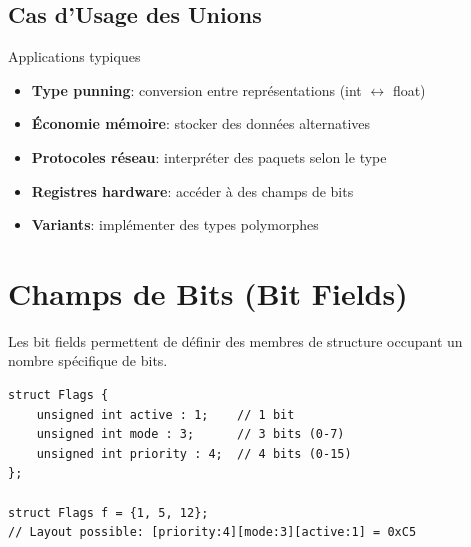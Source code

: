 \documentclass[10pt,a4paper]{article}
\begin{document}
\begin{center}
\end{center}

\subsection{Cas d'Usage des Unions}

\begin{techbox}{Applications typiques}
\begin{itemize}
\item \textbf{Type punning}: conversion entre représentations (int $\leftrightarrow$ float)
\item \textbf{Économie mémoire}: stocker des données alternatives
\item \textbf{Protocoles réseau}: interpréter des paquets selon le type
\item \textbf{Registres hardware}: accéder à des champs de bits
\item \textbf{Variants}: implémenter des types polymorphes
\end{itemize}
\end{techbox}

\section{Champs de Bits (Bit Fields)}

Les bit fields permettent de définir des membres de structure occupant un nombre spécifique de bits.

\begin{lstlisting}
struct Flags {
    unsigned int active : 1;    // 1 bit
    unsigned int mode : 3;      // 3 bits (0-7)
    unsigned int priority : 4;  // 4 bits (0-15)
};

struct Flags f = {1, 5, 12};
// Layout possible: [priority:4][mode:3][active:1] = 0xC5
\end{lstlisting}
\end{document}

